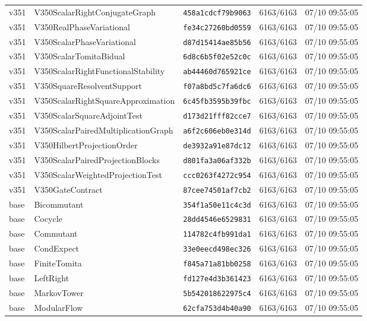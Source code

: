 \documentclass[11pt]{article}
\theoremstyle{definition}\newtheorem{deriv}{Derivação}
\begin{document}
{\begin{longtable}{@{}lllll@{}}
v351 & V350ScalarRightConjugateGraph & \texttt{458a1cdcf79b9063} & 6163/6163 & 07/10 09:55:05 \\
v351 & V350RealPhaseVariational & \texttt{fe34c27260bd0559} & 6163/6163 & 07/10 09:55:05 \\
v351 & V350ScalarPhaseVariational & \texttt{d87d15414ae85b56} & 6163/6163 & 07/10 09:55:05 \\
v351 & V350ScalarTomitaBidual & \texttt{6d8c6b5f02e52c0c} & 6163/6163 & 07/10 09:55:05 \\
v351 & V350ScalarRightFunctionalStability & \texttt{ab44460d765921ce} & 6163/6163 & 07/10 09:55:05 \\
v351 & V350SquareResolventSupport & \texttt{f07a8bd5c7fa6dc6} & 6163/6163 & 07/10 09:55:05 \\
v351 & V350ScalarRightSquareApproximation & \texttt{6c45fb3595b39fbc} & 6163/6163 & 07/10 09:55:05 \\
v351 & V350ScalarSquareAdjointTest & \texttt{d173d21fff82cce7} & 6163/6163 & 07/10 09:55:05 \\
v351 & V350ScalarPairedMultiplicationGraph & \texttt{a6f2c606eb0e314d} & 6163/6163 & 07/10 09:55:05 \\
v351 & V350HilbertProjectionOrder & \texttt{de3932a91e87dc12} & 6163/6163 & 07/10 09:55:05 \\
v351 & V350ScalarPairedProjectionBlocks & \texttt{d801fa3a06af332b} & 6163/6163 & 07/10 09:55:05 \\
v351 & V350ScalarWeightedProjectionTest & \texttt{ccc0263f4272c954} & 6163/6163 & 07/10 09:55:05 \\
v351 & V350GateContract & \texttt{87cee74501af7cb2} & 6163/6163 & 07/10 09:55:05 \\
base & Bicommutant & \texttt{354f1a50e11c4c3d} & 6163/6163 & 07/10 09:55:05 \\
base & Cocycle & \texttt{28dd4546e6529831} & 6163/6163 & 07/10 09:55:05 \\
base & Commutant & \texttt{114782c4fb991da1} & 6163/6163 & 07/10 09:55:05 \\
base & CondExpect & \texttt{33e0eecd498ec326} & 6163/6163 & 07/10 09:55:05 \\
base & FiniteTomita & \texttt{f845a71a81bb0258} & 6163/6163 & 07/10 09:55:05 \\
base & LeftRight & \texttt{fd127e4d3b361423} & 6163/6163 & 07/10 09:55:05 \\
base & MarkovTower & \texttt{5b542018622975c4} & 6163/6163 & 07/10 09:55:05 \\
base & ModularFlow & \texttt{62cfa753d4b40a90} & 6163/6163 & 07/10 09:55:05 \\

\end{longtable}}
\end{document}
